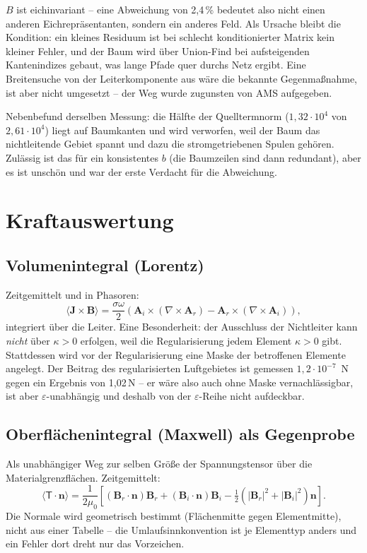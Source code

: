 \documentclass[11pt,a4paper]{article}
\newcommand{\Ar}{\mathbf{A}_r}
\newcommand{\Ai}{\mathbf{A}_i}
\begin{document}
$B$ ist eichinvariant -- eine Abweichung von 2,4\,\% bedeutet also nicht einen
anderen Eichrepräsentanten, sondern ein anderes Feld. Als Ursache bleibt die
Kondition: ein kleines Residuum ist bei schlecht konditionierter Matrix kein
kleiner Fehler, und der Baum wird über Union-Find bei aufsteigenden
Kantenindizes gebaut, was lange Pfade quer durchs Netz ergibt. Eine
Breitensuche von der Leiterkomponente aus wäre die bekannte Gegenmaßnahme,
ist aber nicht umgesetzt -- der Weg wurde zugunsten von AMS aufgegeben.

Nebenbefund derselben Messung: die Hälfte der Quelltermnorm
($1{,}32\cdot10^{4}$ von $2{,}61\cdot10^{4}$) liegt auf Baumkanten und wird
verworfen, weil der Baum das nichtleitende Gebiet spannt und dazu die
stromgetriebenen Spulen gehören. Zulässig ist das für ein konsistentes $b$
(die Baumzeilen sind dann redundant), aber es ist unschön und war der erste
Verdacht für die Abweichung.

\section{Kraftauswertung}

\subsection{Volumenintegral (Lorentz)}

Zeitgemittelt und in Phasoren:
\begin{equation}
  \langle \mathbf{J}\times\mathbf{B}\rangle
  = \frac{\sigma\omega}{2}\left(
      \Ai\times(\nabla\times\Ar) - \Ar\times(\nabla\times\Ai)
    \right),
\end{equation}
integriert über die Leiter. Eine Besonderheit: der Ausschluss der Nichtleiter
kann \emph{nicht} über $\kappa > 0$ erfolgen, weil die Regularisierung jedem
Element $\kappa > 0$ gibt. Stattdessen wird vor der Regularisierung eine Maske
der betroffenen Elemente angelegt. Der Beitrag des regularisierten
Luftgebietes ist gemessen $1{,}2\cdot10^{-7}$~N gegen ein Ergebnis von
1,02\,N -- er wäre also auch ohne Maske vernachlässigbar, ist aber
$\varepsilon$-unabhängig und deshalb von der $\varepsilon$-Reihe nicht
aufdeckbar.

\subsection{Oberflächenintegral (Maxwell) als Gegenprobe}

Als unabhängiger Weg zur selben Größe der Spannungstensor über die
Materialgrenzflächen. Zeitgemittelt:
\begin{equation}
  \langle \mathsf{T}\cdot\mathbf{n}\rangle
  = \frac{1}{2\mu_0}\left[
      (\mathbf{B}_r\!\cdot\!\mathbf{n})\mathbf{B}_r
    + (\mathbf{B}_i\!\cdot\!\mathbf{n})\mathbf{B}_i
    - \tfrac12\left(|\mathbf{B}_r|^2 + |\mathbf{B}_i|^2\right)\mathbf{n}
    \right].
\end{equation}
Die Normale wird geometrisch bestimmt (Flächenmitte gegen Elementmitte), nicht
aus einer Tabelle -- die Umlaufsinnkonvention ist je Elementtyp anders und ein
Fehler dort dreht nur das Vorzeichen.
\end{document}
